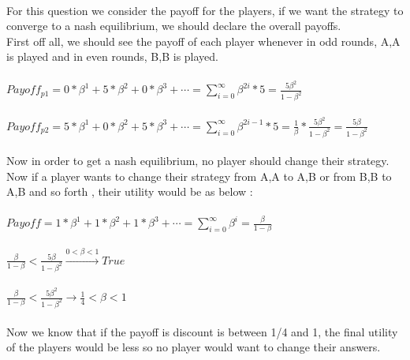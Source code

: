 \\
\begin{latin}
  For this question we consider the payoff for the players, if we want the strategy to converge to a nash equilibrium,
  we should declare the overall payoffs.\\
  First off all, we should see the payoff of each player whenever in odd rounds, A,A is played and in even rounds, B,B is played.
  \\\\
  $Payoff_{p1} =0 * \beta^1 + 5 * \beta^2 + 0*\beta^3 + \cdots =  \sum_{i=0}^{\infty} \beta^{2i} * 5 = \frac{5\beta^2}{1-\beta^2}$\\\\
  $Payoff_{p2} =5 * \beta^1 + 0 * \beta^2 + 5*\beta^3 + \cdots = \sum_{i=0}^{\infty} \beta^{2i-1} * 5 = \frac{1}{\beta} * \frac{5\beta^2}{1-\beta^2} = \frac{5\beta}{1-\beta^2}$\\\\
  Now in order to get a nash equilibrium, no player should change their strategy. Now if a player wants to change their strategy from A,A to A,B or from B,B to A,B and so forth
  , their utility would be as below : \\\\
  $Payoff = 1 * \beta^1 + 1 * \beta^2 + 1*\beta^3 + \cdots =  \sum_{i=0}^{\infty} \beta^{i} =\frac{\beta}{1-\beta}$\\\\
  $\frac{\beta}{1-\beta} < \frac{5\beta}{1-\beta^2} \xrightarrow[]{0<\beta<1} True$\\\\
  $\frac{\beta}{1-\beta} < \frac{5\beta^2}{1-\beta^2} \rightarrow \frac{1}{4}<\beta<1$
  \\\\
  Now we know that if the payoff is discount is between 1/4 and 1, the final utility of the players would be less so no player would want to change their answers.
\end{latin}
